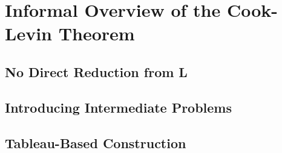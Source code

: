 \chapter{Informal Overview of the Cook-Levin Theorem}

\section{No Direct Reduction from L}

\section{Introducing Intermediate Problems}

\section{Tableau-Based Construction}


